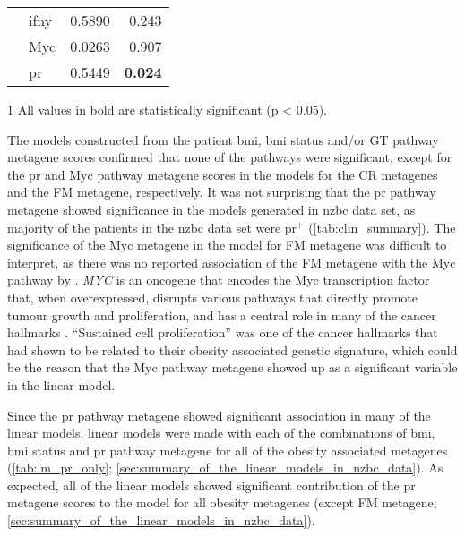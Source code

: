 \begin{table}[htpb]
\begin{threeparttable}
\begin{tabular}{llrr}
                                                                       & \gls{ifny} & 0.5890  & 0.243\\
                                                                       & Myc        & 0.0263  & 0.907\\
                                                                       & \gls{pr}   & 0.5449  & \textbf{0.024}\\
			\hline
			\hline
		\end{tabular}
		\begin{tablenotes}
			\begin{footnotesize}
				\item [1] All values in bold are statistically significant (p \textless{} 0.05).
			\end{footnotesize}
		\end{tablenotes}
	\end{threeparttable}
\end{table}

The models constructed from the patient \gls{bmi}, \gls{bmi} status and/or GT pathway metagene scores confirmed that none of the pathways were significant, except for the \gls{pr} and Myc pathway metagene scores in the models for the CR metagenes and the FM metagene, respectively.
It was not surprising that the \gls{pr} pathway metagene showed significance in the models generated in \gls{nzbc} data set, as majority of the patients in the \gls{nzbc} data set were \gls{pr}$^+$ (\cref{tab:clin_summary}).
The significance of the Myc metagene in the model for FM metagene was difficult to interpret, as there was no reported association of the FM metagene with the Myc pathway by \citet{Fuentes-Mattei2014}.
\textit{MYC} is an oncogene that encodes the Myc transcription factor that, when overexpressed, disrupts various pathways that directly promote tumour growth and proliferation, and has a central role in many of the cancer hallmarks \citep{Coller2000,Hanahan2000}.
``Sustained cell proliferation'' was one of the cancer hallmarks that \citet{Fuentes-Mattei2014} had shown to be related to their obesity associated genetic signature, which could be the reason that the Myc pathway metagene showed up as a significant variable in the linear model.

Since the \gls{pr} pathway metagene showed significant association in many of the linear models, linear models were made with each of the combinations of \gls{bmi}, \gls{bmi} status and \gls{pr} pathway metagene for all of the obesity associated metagenes (\cref{tab:lm_pr_only}; \cref{sec:summary_of_the_linear_models_in_nzbc_data}).
As expected, all of the linear models showed significant contribution of the \gls{pr} metagene scores to the model for all obesity metagenes (except FM metagene; \cref{sec:summary_of_the_linear_models_in_nzbc_data}).


